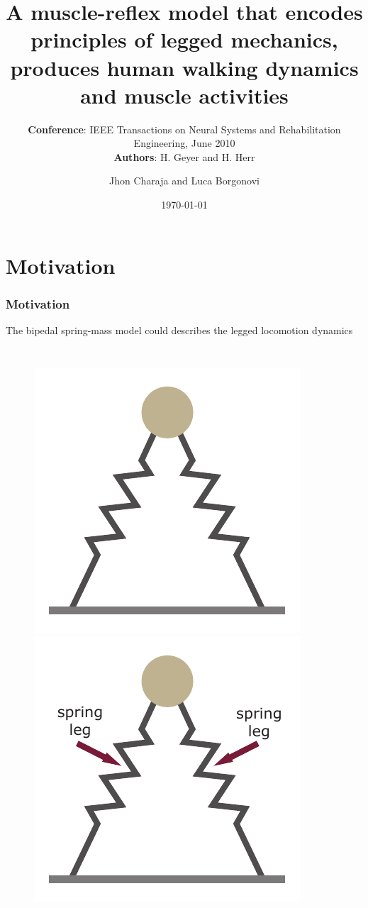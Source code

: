 \documentclass[10pt]{beamer}
\title[Article presentation]{A muscle-reflex model that encodes principles of legged mechanics, produces human walking dynamics and muscle activities}
\subtitle{
	\textbf{Conference}: IEEE Transactions on Neural Systems and Rehabilitation Engineering, June 2010
	\\ \textbf{Authors}: H. Geyer and H. Herr}
\author[J. Charaja and L. Borgonovi]{Jhon Charaja\inst{1} and Luca Borgonovi\inst{1}}
\institute[USP]{
	\inst{1} Universidade de São Paulo, Brasil
}
\date{\today}
\begin{document}
	\frame{\titlepage}
	
	\section{Motivation}
	\begin{frame}
		\frametitle{Motivation}
		The bipedal spring-mass model could describes the legged locomotion dynamics\footnotemark[1]
		\begin{columns}
			\begin{figure}
				\begin{overprint}
					\includegraphics[width=.9\textwidth]{images/slip/double_SLIP.pdf}
					\onslide<2>\includegraphics[width=.9\textwidth]{images/slip/double_SLIP_spring_leg.pdf}

\end{overprint}
\end{figure}
\end{columns}
\end{frame}
\end{document}
